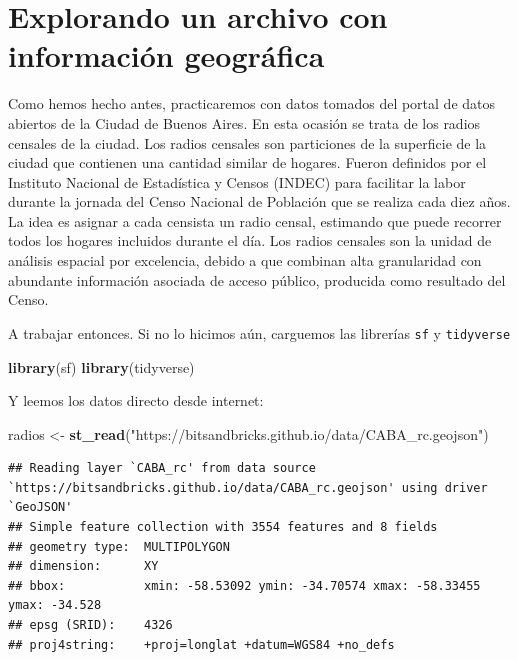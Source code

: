 \documentclass[]{book}
\newenvironment{Shaded}{\begin{snugshade}}{\end{snugshade}}
\newcommand{\KeywordTok}[1]{\textcolor[rgb]{0.13,0.29,0.53}{\textbf{#1}}}
\newcommand{\StringTok}[1]{\textcolor[rgb]{0.31,0.60,0.02}{#1}}
\newcommand{\NormalTok}[1]{#1}
\begin{document}
\section{Explorando un archivo con información
geográfica}\label{explorando-un-archivo-con-informacion-geografica}

Como hemos hecho antes, practicaremos con datos tomados del portal de
datos abiertos de la Ciudad de Buenos Aires. En esta ocasión se trata de
los radios censales de la ciudad. Los radios censales son particiones de
la superficie de la ciudad que contienen una cantidad similar de
hogares. Fueron definidos por el Instituto Nacional de Estadística y
Censos (INDEC) para facilitar la labor durante la jornada del Censo
Nacional de Población que se realiza cada diez años. La idea es asignar
a cada censista un radio censal, estimando que puede recorrer todos los
hogares incluidos durante el día. Los radios censales son la unidad de
análisis espacial por excelencia, debido a que combinan alta
granularidad con abundante información asociada de acceso público,
producida como resultado del Censo.

A trabajar entonces. Si no lo hicimos aún, carguemos las librerías
\texttt{sf} y \texttt{tidyverse}

\begin{Shaded}
\begin{Highlighting}[]
\KeywordTok{library}\NormalTok{(sf)}
\KeywordTok{library}\NormalTok{(tidyverse)}
\end{Highlighting}
\end{Shaded}

Y leemos los datos directo desde internet:

\begin{Shaded}
\begin{Highlighting}[]
\NormalTok{radios <-}\StringTok{ }\KeywordTok{st_read}\NormalTok{(}\StringTok{"https://bitsandbricks.github.io/data/CABA_rc.geojson"}\NormalTok{)}
\end{Highlighting}
\end{Shaded}

\begin{verbatim}
## Reading layer `CABA_rc' from data source `https://bitsandbricks.github.io/data/CABA_rc.geojson' using driver `GeoJSON'
## Simple feature collection with 3554 features and 8 fields
## geometry type:  MULTIPOLYGON
## dimension:      XY
## bbox:           xmin: -58.53092 ymin: -34.70574 xmax: -58.33455 ymax: -34.528
## epsg (SRID):    4326
## proj4string:    +proj=longlat +datum=WGS84 +no_defs
\end{verbatim}
\end{document}
